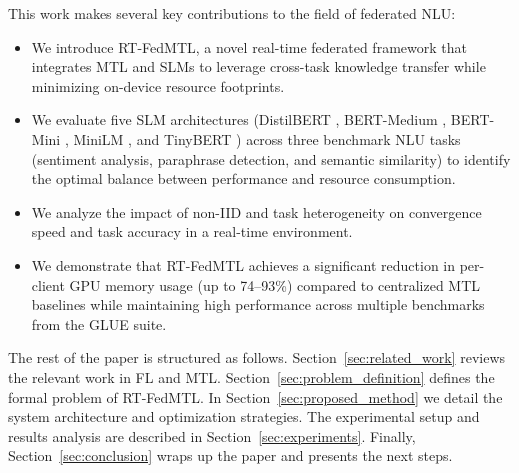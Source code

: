 This work makes several key contributions to the field of federated NLU:
\begin{itemize}
    \item We introduce RT-FedMTL, a novel real-time federated framework that integrates MTL and SLMs to leverage cross-task knowledge transfer while minimizing on-device resource footprints.
    \item We evaluate five SLM architectures (DistilBERT \cite{sanh2019distilbert}, BERT-Medium \cite{devlin2018bert}, BERT-Mini \cite{devlin2018bert}, MiniLM \cite{wang2020minilm}, and TinyBERT \cite{jiao2019tinybert}) across three benchmark NLU tasks (sentiment analysis, paraphrase detection, and semantic similarity) to identify the optimal balance between performance and resource consumption.
    \item We analyze the impact of non-IID and task heterogeneity on convergence speed and task accuracy in a real-time environment.
    \item We demonstrate that RT-FedMTL achieves a significant reduction in per-client GPU memory usage (up to 74--93\%) compared to centralized MTL baselines while maintaining high performance across multiple benchmarks from the GLUE suite.
\end{itemize}

The rest of the paper is structured as follows. Section~\ref{sec:related_work} reviews the relevant work in FL and MTL. Section~\ref{sec:problem_definition} defines the formal problem of RT-FedMTL. In Section~\ref{sec:proposed_method} we detail the system architecture and optimization strategies. The experimental setup and results analysis are described in Section~\ref{sec:experiments}. Finally, Section~\ref{sec:conclusion} wraps up the paper and presents the next steps.